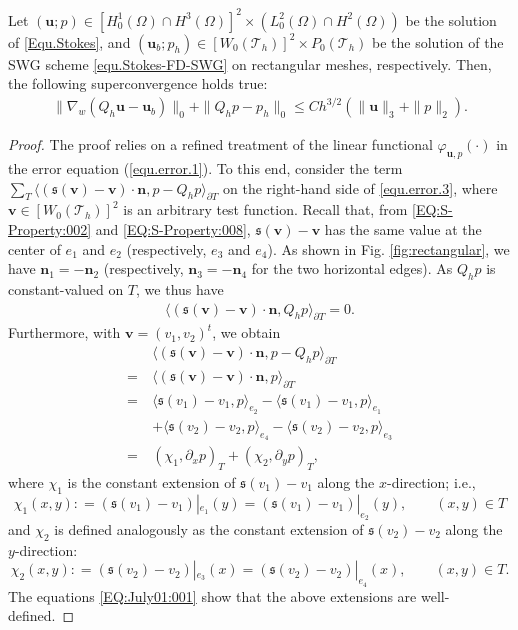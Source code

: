 \documentclass[final,leqno]{siamltex704}
\def\S{{\mathfrak s}}
\def\T{{\mathcal T}}
\begin{document}
\begin{theorem}\label{thm.error.2}
Let $(\bm{u};p) \in [H_0^1(\Omega)\cap H^{3}(\Omega)]^2\times (L_0^2(\Omega)\cap H^{2}(\Omega))$ be the solution of \eqref{Equ.Stokes}, and $(\bm{u}_b;p_h) \in [W_0(\T_h)]^2 \times P_0(\T_h)$ be the solution of the SWG scheme \eqref{equ.Stokes-FD-SWG} on rectangular meshes, respectively.
Then, the following superconvergence holds true:
\begin{eqnarray} \label{equ.thm.error.2}
\|\nabla_w(Q_h \bm{u} - \bm{u}_b )\|_0 + \|Q_h p - p_h\|_0 \leq Ch^{3/2} (\|\bm{u}\|_3 + \|p\|_2).
\end{eqnarray}
\end{theorem}
\begin{proof}
The proof relies on a refined treatment of the linear functional $\varphi_{\bm{u},p}(\cdot)$ in the error equation (\ref{equ.error.1}). To this end, consider the term $\sum_{T} \langle (\S(\bm{v})-\bm{v})\cdot \bm{n},p - Q_h p\rangle_{\partial T}$ on the right-hand side of  \eqref{equ.error.3}, where $\bm{v} \in [W_0(\T_h)]^2$ is an arbitrary test function. Recall that, from \eqref{EQ:S-Property:002} and \eqref{EQ:S-Property:008}, $\S(\bm{v})-\bm{v}$ has the same value at the center of $e_1$ and $e_2$ (respectively, $e_3$ and $e_4$). As shown in Fig. \ref{fig:rectangular}, we have $\bm{n}_{1}=- \bm{n}_{2}$ (respectively, $\bm{n}_{3}=- \bm{n}_{4}$ for the two horizontal edges). As $Q_h p$ is constant-valued on $T$, we thus have
\begin{eqnarray*}
\langle(\S(\bm{v})-\bm{v})\cdot\bm{n}, Q_h p\rangle_{\partial T} =0.
\end{eqnarray*}
Furthermore, with $\bm{v}=(v_1,v_2)^t$, we obtain
\begin{equation}\label{EQ:div:001}
\begin{split}
& \langle(\S(\bm{v})-\bm{v})\cdot \bm{n},p- Q_h p\rangle_{\partial T} \\
=\ &\langle(\S(\bm{v})-\bm{v})\cdot \bm{n},p\rangle_{\partial T}\\
=\ &\langle\S(v_1)-v_1,p\rangle_{e_2} - \langle\S(v_1)-v_1,p\rangle_{e_1}\\
\ &+ \langle\S(v_2)-v_2,p\rangle_{e_4} - \langle\S(v_2)-v_2,p\rangle_{e_3}\\
=\ & (\chi_1, \partial_x p)_T + (\chi_2, \partial_y p)_T,
\end{split}
\end{equation}
where $\chi_1$ is the constant extension of $\S(v_1)-v_1$ along the $x$-direction; i.e.,
$$
\chi_1(x,y): = (\S(v_1)-v_1)|_{e_1}(y) = (\S(v_1)-v_1)|_{e_2}(y),\qquad (x,y)\in T
$$
and $\chi_2$ is defined analogously as the constant extension of $\S(v_2)-v_2$ along the $y$-direction:
$$
\chi_2(x,y): = (\S(v_2)-v_2)|_{e_3}(x) = (\S(v_2)-v_2)|_{e_4}(x),\qquad (x,y)\in T.
$$
The equations \eqref{EQ:July01:001} show that the above extensions are well-defined.


\end{proof}
\end{document}

